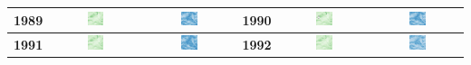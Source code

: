\begin{longtable}{|c|c|c|c|c|c|}
    \textbf{1989} & \includegraphics[width=0.2\textwidth]{img_sat/NDVI_1989.png} & \includegraphics[width=0.2\textwidth]{img_sat/NSI_1989.png} &
    \textbf{1990} & \includegraphics[width=0.2\textwidth]{img_sat/NDVI_1990.png} & \includegraphics[width=0.2\textwidth]{img_sat/NSI_1990.png} \\
    \hline
    

    \textbf{1991} & \includegraphics[width=0.2\textwidth]{img_sat/NDVI_1991.png} & \includegraphics[width=0.2\textwidth]{img_sat/NSI_1991.png} &
    \textbf{1992} & \includegraphics[width=0.2\textwidth]{img_sat/NDVI_1992.png} & \includegraphics[width=0.2\textwidth]{img_sat/NSI_1992.png} \\
    \hline
    


\end{longtable}
